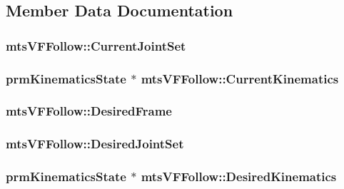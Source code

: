 \subsection{Member Data Documentation}
\hypertarget{classmts_v_f_follow_ae704f3167a578520448f6f47aa032aff}{
\subsubsection[{Current\-Joint\-Set}]{ mts\-V\-F\-Follow\-::\-Current\-Joint\-Set}}\label{classmts_v_f_follow_ae704f3167a578520448f6f47aa032aff}
\hypertarget{classmts_v_f_follow_af2d523404ee1df9df0c2346ba9a419cd}{
\subsubsection[{Current\-Kinematics}]{\setlength{\rightskip}{0pt plus 5cm}prm\-Kinematics\-State $\ast$ mts\-V\-F\-Follow\-::\-Current\-Kinematics}}\label{classmts_v_f_follow_af2d523404ee1df9df0c2346ba9a419cd}
\hypertarget{classmts_v_f_follow_a3561088c012af44b6dcd0a54f6fce5ae}{
\subsubsection[{Desired\-Frame}]{ mts\-V\-F\-Follow\-::\-Desired\-Frame}}\label{classmts_v_f_follow_a3561088c012af44b6dcd0a54f6fce5ae}
\hypertarget{classmts_v_f_follow_ae4c68fd6c7d03a6bcdb86d1e2e5dae60}{
\subsubsection[{Desired\-Joint\-Set}]{ mts\-V\-F\-Follow\-::\-Desired\-Joint\-Set}}\label{classmts_v_f_follow_ae4c68fd6c7d03a6bcdb86d1e2e5dae60}
\hypertarget{classmts_v_f_follow_a875d4d21dbe800b29573458c35e33fe2}{
\subsubsection[{Desired\-Kinematics}]{\setlength{\rightskip}{0pt plus 5cm}prm\-Kinematics\-State $\ast$ mts\-V\-F\-Follow\-::\-Desired\-Kinematics}}\label{classmts_v_f_follow_a875d4d21dbe800b29573458c35e33fe2}
